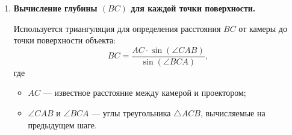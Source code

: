 \begin{enumerate}[label=\arabic*.]
        Для вычисления расстояния от камеры до точки поверхности необходимо определить два угла треугольника \( \triangle ACB \):
        \begin{itemize}
            \item \( \angle CAB \) — угол между направлением от камеры \( C \) к проектору \( A \) и направлением от камеры \( C \) к точке на поверхности \( B \). Он вычисляется по формуле:
\begin{equation}
            \angle CAB = \arctan\left(\frac{x' - x_0}{f}\right),
\end{equation}
            где
        \begin{itemize}
            \item \( x' \) — горизонтальная координата пикселя на изображении,
            \item \( x_0 \) — координата оптического центра камеры,
            \item \( f \) — фокусное расстояние;
\end{itemize}
            \item \( \angle BCA \) — угол между направлением от точки \( B \) на поверхности к камере \( C \) и направлением от точки \( B \) к проектору \( A \). Он вычисляется по формуле:
\begin{equation}
            \angle BCA = \arctan\left(\frac{y' - y_0}{f}\right),
\end{equation}
            где
            \begin{itemize}
\item \( y' \) --- вертикальная координата пикселя на изображении,
\item \( y_0 \) --- координата оптического центра камеры,
\item \( f \) --- фокусное расстояние.
        \end{itemize}
        \end{itemize}

        \item \textbf{Вычисление глубины $(BC)$ для каждой точки поверхности.}

        Используется триангуляция для определения расстояния \( BC \) от камеры до точки поверхности объекта:
        \begin{equation}
        BC = \frac{AC \cdot \sin(\angle CAB)}{\sin(\angle BCA)},
        \end{equation}
        где
        \begin{itemize}
            \item \( AC \) — известное расстояние между камерой и проектором;
            \item \( \angle CAB \) и \( \angle BCA \) — углы треугольника \( \triangle ACB \), вычисляемые на предыдущем шаге.
        \end{itemize}


\end{enumerate}
